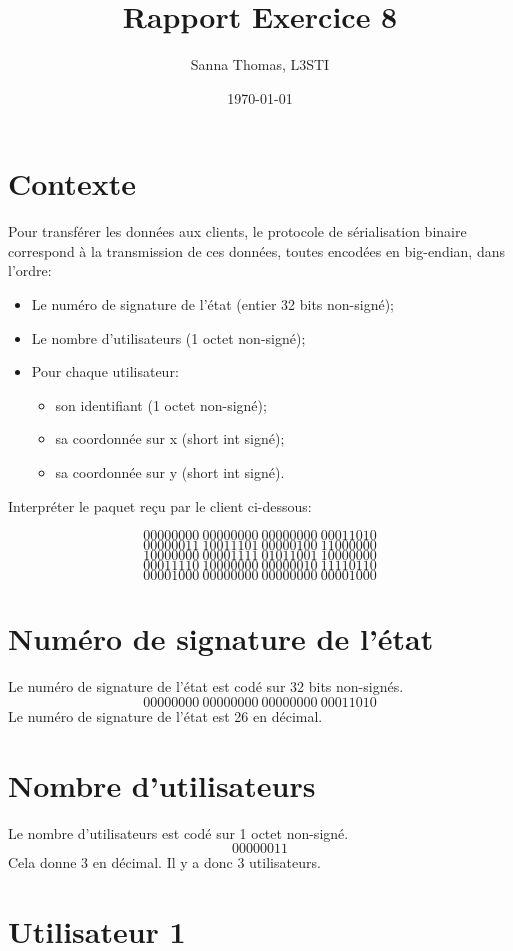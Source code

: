 \documentclass{article}
\title{Rapport Exercice 8}
\author{Sanna Thomas, L3STI}
\date{\today}
\begin{document}
\maketitle

\section*{Contexte}

Pour transférer les données aux clients, le protocole de sérialisation binaire correspond
à la transmission de ces données, toutes encodées en big-endian, dans l’ordre:
\begin{itemize}
  \item Le numéro de signature de l’état (entier 32 bits non-signé);
  \item Le nombre d’utilisateurs (1 octet non-signé);
  \item Pour chaque utilisateur:
  \begin{itemize}
    \item son identifiant (1 octet non-signé);
    \item sa coordonnée sur x (short int signé);
    \item sa coordonnée sur y (short int signé).
  \end{itemize}
\end{itemize}
Interpréter le paquet reçu par le client ci-dessous:

\[00000000 \ 00000000 \ 00000000 \ 00011010\]
\[00000011 \ 10011101 \ 00000100 \ 11000000\]
\[10000000 \ 00001111 \ 01011001 \ 10000000\]
\[00011110 \ 10000000 \ 00000010 \ 11110110\]
\[00001000 \ 00000000 \ 00000000 \ 00001000\]

\section{Numéro de signature de l'état}

Le numéro de signature de l'état est codé sur 32 bits non-signés.
\[00000000 \ 00000000 \ 00000000 \ 00011010\]
Le numéro de signature de l'état est 26 en décimal.

\section{Nombre d'utilisateurs}

Le nombre d'utilisateurs est codé sur 1 octet non-signé.
\[00000011\] 
Cela donne 3 en décimal. Il y a donc 3 utilisateurs.

\section{Utilisateur 1}
\end{document}
